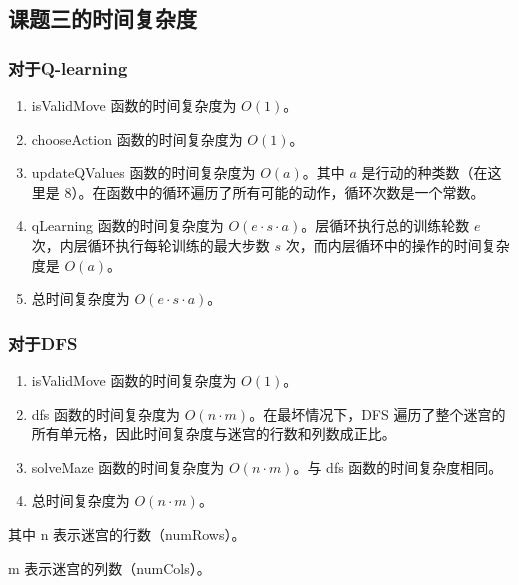 \documentclass[UTF8,titlepage]{ctexart}
\numberwithin{figure}{section}
\begin{document}
\subsection{课题三的时间复杂度}
\subsubsection{对于Q-learning}

\begin{enumerate}
\item isValidMove 函数的时间复杂度为 $O(1)$。
\item chooseAction 函数的时间复杂度为 $O(1)$。
\item updateQValues 函数的时间复杂度为 $O(a)$。其中 $a$ 是行动的种类数（在这里是 8）。在函数中的循环遍历了所有可能的动作，循环次数是一个常数。
\item qLearning 函数的时间复杂度为 $O(e \cdot s \cdot a)$。层循环执行总的训练轮数 $e$ 次，内层循环执行每轮训练的最大步数 $s$ 次，而内层循环中的操作的时间复杂度是 $O(a)$。
\item 总时间复杂度为 $O(e \cdot s \cdot a)$。
\end{enumerate}

\subsubsection{对于DFS}

\begin{enumerate}
\item isValidMove 函数的时间复杂度为 $O(1)$。
\item dfs 函数的时间复杂度为 $O(n \cdot m)$。在最坏情况下，DFS 遍历了整个迷宫的所有单元格，因此时间复杂度与迷宫的行数和列数成正比。
\item solveMaze 函数的时间复杂度为 $O(n \cdot m)$。与 dfs 函数的时间复杂度相同。
\item 总时间复杂度为 $O(n \cdot m)$。
\end{enumerate}
其中
n 表示迷宫的行数（numRows）。

m 表示迷宫的列数（numCols）。
\end{document}
